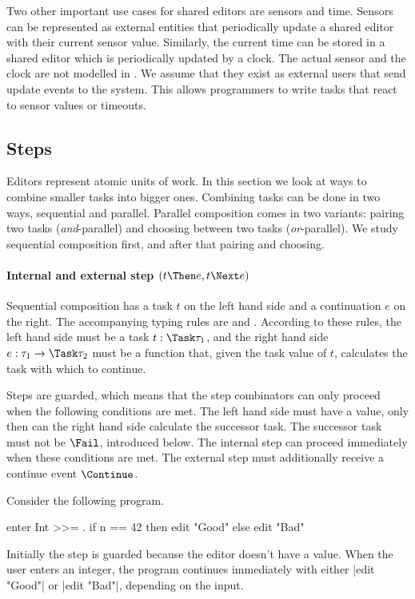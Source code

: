 \label{sub:time}
Two other important use cases for shared editors are sensors and time.
Sensors can be represented as external entities that periodically update a shared editor with their current sensor value.
Similarly, the current time can be stored in a shared editor which is periodically updated by a clock.
The actual sensor and the clock are not modelled in \TOPHAT.
We assume that they exist as external users that send update events to the system.
This allows programmers to write tasks that react to sensor values or timeouts.


\subsection{Steps}

Editors represent atomic units of work.
In this section we look at ways to combine smaller tasks into bigger ones.
Combining tasks can be done in two ways, sequential and parallel.
Parallel composition comes in two variants: pairing two tasks (\emph{and}-parallel) and choosing between two tasks (\emph{or}-parallel).
We study sequential composition first, and after that pairing and choosing.


\paragraph{Internal and external step $(t \Then e, t \Next e)$}
\label{sub:steps}

Sequential composition has a task $t$ on the left hand side and a continuation $e$ on the right.
The accompanying typing rules are  and .
According to these rules, the left hand side must be a task $t : \Task \tau_1$, and the right hand side $e : \tau_1 \to \Task \tau_2$ must be a function that, given the task value of $t$, calculates the task with which to continue.

Steps are guarded, which means that the step combinators can only proceed when the following conditions are met.
The left hand side must have a value, only then can the right hand side calculate the successor task.
The successor task must not be $\Fail$, introduced below.
The internal step can proceed immediately when these conditions are met.
The external step must additionally receive a continue event $\Continue$.


\begin{example}
\label{exm:conditions}

Consider the following program.
\begin{TASK}
  enter Int >>= \n. if n == 42 then edit "Good" else edit "Bad"
\end{TASK}
Initially the step is guarded because the editor doesn't have a value.
When the user enters an integer, the program continues immediately with either \TS|edit "Good"| or \TS|edit "Bad"|, depending on the input.

\end{example}





